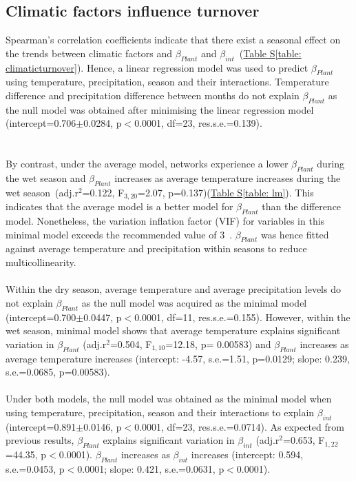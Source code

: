 \documentclass[11pt]{article}
\begin{document}
\subsection{Climatic factors influence turnover}
\label{subsec: climate}
Spearman's correlation coefficients indicate that there exist a seasonal effect on the trends between climatic factors and $\beta_{Plant}$ and $\beta_{int}$~(\hyperref[table: climaticturnover]{Table S\ref{table: climaticturnover}}). Hence, a linear regression model was used to predict $\beta_{Plant}$ using temperature, precipitation, season and their interactions. Temperature difference and precipitation difference between months do not explain $\beta_{Plant}$ as the null model was obtained after minimising the linear regression model (intercept=0.706$\pm$0.0284, p$<$0.0001, df=23, res.s.e.=0.139). \\
\\
\\
By contrast, under the average model, networks experience a lower $\beta_{Plant}$ during the wet season and $\beta_{Plant}$ increases as average temperature increases during the wet season~(adj.r$^{2}$=0.122, F$_{3,20}$=2.07, p=0.137)(\hyperref[table: lm]{Table S\ref{table: lm}}). This indicates that the average model is a better model for $\beta_{Plant}$ than the difference model. Nonetheless, the variation inflation factor (VIF) for variables in this minimal model exceeds the recommended value of 3~\citep{Zuur2010}. $\beta_{Plant}$ was hence fitted against average temperature and precipitation within seasons to reduce multicollinearity. \\
\\
Within the dry season, average temperature and average precipitation levels do not explain $\beta_{Plant}$ as the null model was acquired as the minimal model (intercept=0.700$\pm$0.0447, p$<$0.0001, df=11, res.s.e.=0.155). However, within the wet season, minimal model shows that average temperature explains significant variation in $\beta_{Plant}$ (adj.r$^{2}$=0.504, F$_{1,10}$=12.18, p= 0.00583) and $\beta_{Plant}$ increases as average temperature increases (intercept: -4.57, s.e.=1.51, p=0.0129; slope: 0.239, s.e.=0.0685, p=0.00583). \\
\\
Under both models, the null model was obtained as the minimal model when using temperature, precipitation, season and their interactions to explain $\beta_{int}$ (intercept=0.891$\pm$0.0146, p$<$0.0001, df=23, res.s.e.=0.0714). As expected from previous results, $\beta_{Plant}$ explains significant variation in $\beta_{int}$ (adj.r$^{2}$=0.653, F$_{1,22}$=44.35, p$<$0.0001). $\beta_{Plant}$ increases as $\beta_{int}$ increases (intercept: 0.594, s.e.=0.0453, p$<$0.0001; slope: 0.421, s.e.=0.0631, p$<$0.0001). \\
\end{document}
